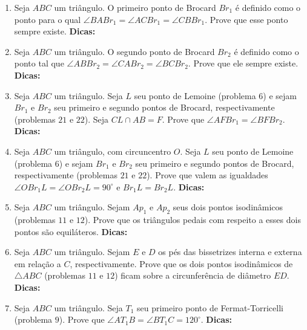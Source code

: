 \documentclass{article}
\newcommand{\dica}{\textbf{Dicas:}}
\newcommand{\iniTri}{Seja $ABC$ um triângulo}
\begin{document}
\begin{multicols}{2}
\begin{enumerate}
    \item \iniTri. O primeiro ponto de Brocard $Br_1$ é definido como o ponto para o qual $\angle BABr_1=\angle ACBr_1= \angle CBBr_1$. Prove que esse ponto sempre existe. \dica %
    
    \item \iniTri. O segundo ponto de Brocard $Br_2$ é definido como o ponto tal que $\angle ABBr_2 = \angle CABr_2 = \angle BCBr_2$. Prove que ele sempre existe. \dica %
    
    \item \iniTri. Seja $L$ seu ponto de Lemoine (problema $6$) e sejam $Br_1$ e $Br_2$ seu primeiro e segundo pontos de Brocard, respectivamente (problemas $21$ e $22$). Seja $CL\cap AB=F$. Prove que $\angle AFBr_1=\angle BFBr_2$. \dica %
    
    \item \iniTri, com circuncentro $O$. Seja $L$ seu ponto de Lemoine (problema $6$) e sejam $Br_1$ e $Br_2$ seu primeiro e segundo pontos de Brocard, respectivamente (problemas $21$ e $22$). Prove que valem as igualdades $\angle OBr_1L=\angle OBr_2L=90^{\circ}$ e $Br_1L=Br_2L$. \dica %
    
    \item \iniTri. Sejam $Ap_1$ e $Ap_2$ seus dois pontos isodinâmicos (problemas $11$ e $12$). Prove que os triângulos pedais com respeito a esses dois pontos são equiláteros. \dica %
    
    \item \iniTri. Sejam $E$ e $D$ os pés das bissetrizes interna e externa em relação a $C$, respectivamente. Prove que os dois pontos isodinâmicos de $\triangle ABC$ (problemas $11$ e $12$) ficam sobre a circunferência de diâmetro $ED$. \dica %
    
    \item \iniTri. Seja $T_1$ seu primeiro ponto de Fermat-Torricelli (problema $9$). Prove que $\angle AT_1B=\angle BT_1C=120^{\circ}$. \dica %
    

\end{enumerate}
\end{multicols}
\end{document}
